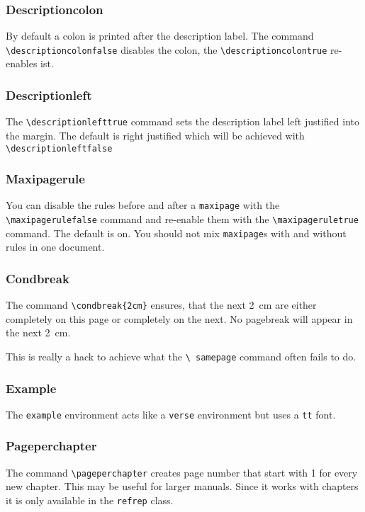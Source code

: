 \subsubsection{Descriptioncolon}

By default a colon is printed after the description label.
The command \texttt{\textbackslash description\-colonfalse}  disables 
the colon, the \texttt{\textbackslash description\-colontrue} 
re-enables ist.

\subsubsection{Descriptionleft}

The \verb|\descriptionlefttrue| command sets the description label 
left justified into the margin. The default is right justified which 
will be achieved with \verb|\descriptionleftfalse|

\subsubsection{Maxipagerule}

You can disable the rules before and after a \texttt{maxipage} with 
the \texttt{\textbackslash maxipage\-rulefalse} command and re-enable 
them with the \texttt{\textbackslash maxipageruletrue} command.  The 
default is on.  You should not mix \texttt{maxipage}s with and without 
rules in one document.

\subsubsection{Condbreak}

The command \verb|\condbreak{2cm}| ensures, that the next 2~cm are 
either completely on this page or completely on the next. No 
pagebreak will appear in the next 2~cm.

This is really a hack to achieve what the \texttt{\textbackslash 
samepage} command often fails to do.

\subsubsection{Example}

The \texttt{example} environment acts like a \texttt{verse} 
environment but uses a \texttt{tt} font.  

\subsubsection{Pageperchapter}

The command \verb|\pageperchapter| creates page number that start with 
1 for every new chapter. This may be useful for larger manuals. Since 
it works with chapters it is only available in the 
\texttt{refrep} class.

\printindex
\endinput

